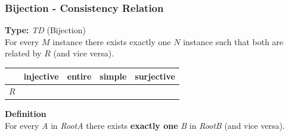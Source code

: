 \documentclass{beamer}
\newcommand{\cmark}{\ding{51}}%
\begin{document}
\begin{frame}
\frametitle{Bijection - \textbf{Consistency Relation}}

\textbf{Type:} \textit{TD} (Bijection)\\

For every $M$ instance there
exists exactly one $N$ instance such that both are related by $R$ (and vice versa).


\begin{center}
\begin{tabular}{| c | c | c | c | c | }
  \hline                        
   & injective & entire & simple & surjective \\
  \hline 
  $R$ & \cmark & \cmark & \cmark & \cmark\\
  \hline  
\end{tabular}
\end{center}


\textbf{Definition}\\

For every \textit{A} in \textit{RootA} there
exists \textbf{exactly one} \textit{B} in \textit{RootB} (and vice versa).


\end{frame}
\end{document}
